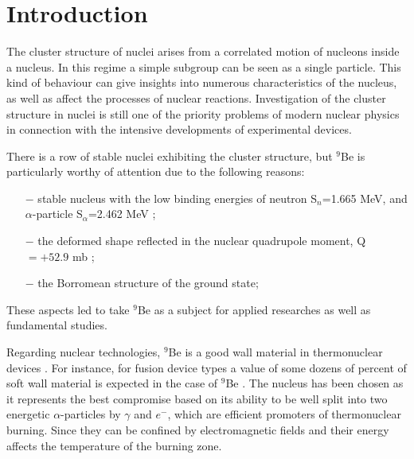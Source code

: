 \documentclass[10pt]{iopart}
\begin{document}
\section{Introduction}
The cluster structure of nuclei arises from a correlated motion of nucleons inside a nucleus. In this regime a simple subgroup can be seen as a single particle. This kind of behaviour can give insights into numerous characteristics of the nucleus, as well as affect the processes of nuclear reactions. Investigation of the cluster structure in nuclei is still one of the priority problems of modern nuclear physics in connection with the intensive developments of experimental devices.

There is a row of stable nuclei exhibiting the cluster structure, but $^9$Be is particularly worthy of attention due to the following reasons: \begin{itemize}
\item[$-$] stable nucleus with the low binding energies of neutron S$_n$=1.665 MeV, and $\alpha$-particle S$_\alpha$=2.462 MeV \cite{separationneutron};
\item[$-$] the deformed shape reflected in the nuclear quadrupole moment, Q$=+52.9 $ mb \cite{quadrupole};
\item[$-$]  the Borromean structure of the ground state;
\end{itemize}
These aspects led to take $^9$Be as a subject for  applied researches as well as fundamental  studies.

Regarding nuclear technologies, $^9$Be is a good wall material in thermonuclear devices \cite{kukulin2010, seksembayev2018}.
For instance, for fusion device types a value of some dozens of percent of soft wall material is expected in the case of $^9$Be \cite{seksembayev2018}. 
The nucleus  has been chosen as it represents the best compromise based  on its ability to be well split into two energetic $\alpha$-particles by $\gamma$ and $e^-$, which are efficient promoters of thermonuclear burning. Since they can be confined by electromagnetic fields and their energy affects the temperature of the burning zone.
\end{document}
